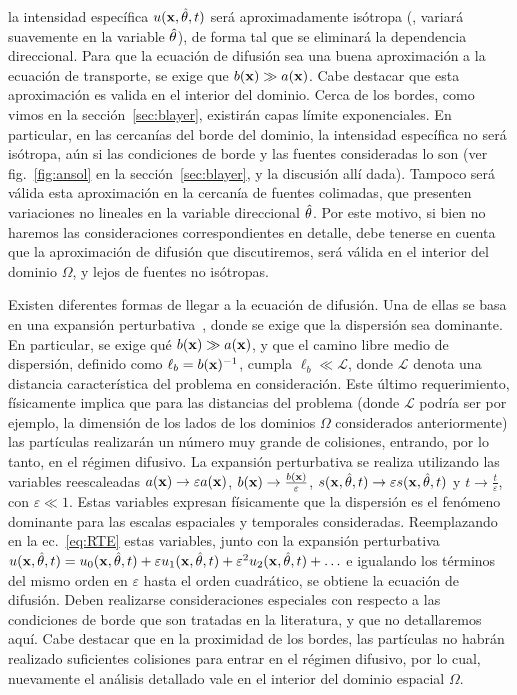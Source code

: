 la intensidad específica $u(\mathbf{x},\hat{\theta},t)$ será aproximadamente 
isótropa (\ie, variará suavemente en la variable $\hat{\theta}$), 
de forma tal que se eliminará la dependencia direccional. Para que la 
ecuación de difusión sea una buena aproximación a la ecuación de 
transporte, se exige que $b(\mathbf{x})\gg a(\mathbf{x})$. Cabe destacar que esta aproximación 
es valida en el interior del dominio. Cerca de los bordes, como vimos en la sección~\ref{sec:blayer}, existirán capas límite exponenciales. 
En particular, en las cercanías del borde del dominio, la intensidad específica no será isótropa, 
aún si las condiciones de borde y las fuentes consideradas lo son (ver fig.~\ref{fig:ansol} 
en la sección~\ref{sec:blayer}, y la discusión allí dada). Tampoco será válida esta 
aproximación en la cercanía de fuentes colimadas, que presenten variaciones no lineales en la variable 
direccional $\hat{\theta}$. Por este motivo, si bien no haremos las consideraciones correspondientes 
en detalle, debe tenerse en cuenta que la aproximación de difusión que discutiremos, 
será válida en el interior del dominio $\Omega$, y lejos de fuentes no isótropas. 

Existen diferentes formas 
de llegar a la ecuación de difusión. Una de ellas se basa en  una expansión perturbativa~\cite{Larsen1974,Larsen1987,Arridge2009}, 
donde se exige que la dispersión sea dominante. En particular, se exige qué $b(\mathbf{x}) \gg a(\mathbf{x})$, 
y que el camino libre medio de dispersión, definido como $\ell_b=b(\mathbf{x})^{-1}$, cumpla $\ell_b\ll \mathcal{L}$, 
donde $\mathcal{L}$ denota una distancia característica del problema en consideración. 
Este último requerimiento, físicamente implica que para las distancias del problema (donde $\mathcal{L}$ 
podría ser por ejemplo, la dimensión de los lados de los dominios $\Omega$ considerados anteriormente) las partículas realizarán un número muy grande de colisiones, entrando, por lo tanto, en el régimen difusivo. La expansión perturbativa se realiza utilizando las variables 
reescaleadas $a(\mathbf{x}) \rightarrow \varepsilon a(\mathbf{x})$, $b(\mathbf{x}) \rightarrow \frac{b(\mathbf{x})}{\varepsilon}$, $s(\mathbf{x},\hat{\theta},t)\rightarrow  \varepsilon s(\mathbf{x},\hat{\theta},t)$ y $t\rightarrow \frac{t}{\varepsilon}$, con $\varepsilon \ll 1$. Estas variables  expresan físicamente que la dispersión es el fenómeno dominante para las 
escalas espaciales y temporales consideradas. Reemplazando en la ec.~\eqref{eq:RTE} estas variables, junto con la expansión perturbativa $u(\mathbf{x},\hat{\theta},t)=u_0(\mathbf{x},\hat{\theta},t)+\varepsilon u_1(\mathbf{x},\hat{\theta},t)+\varepsilon^2 u_2(\mathbf{x},\hat{\theta},t)+\ldots$ e igualando los términos del mismo orden en $\varepsilon$ 
hasta el orden cuadrático, se obtiene la ecuación de difusión. Deben realizarse consideraciones especiales con respecto a las condiciones de 
borde que son tratadas en la literatura, y que no detallaremos aquí. Cabe destacar que en la proximidad de los bordes, las partículas no habrán realizado suficientes colisiones para entrar en el régimen difusivo, por lo cual, nuevamente el análisis detallado vale en el interior del dominio espacial $\Omega$. 

